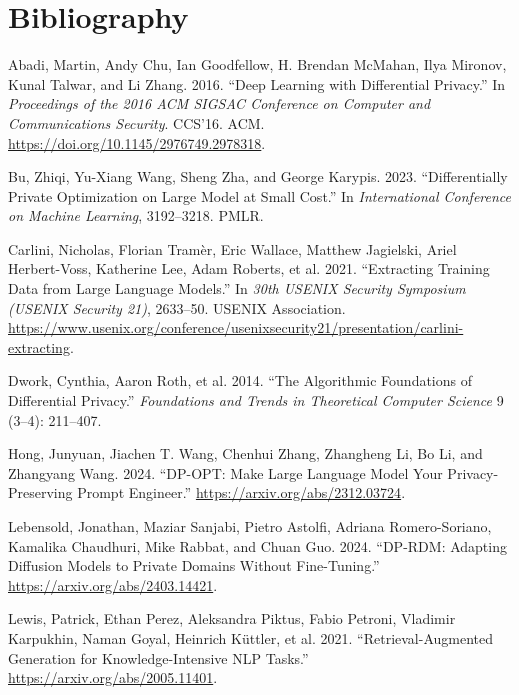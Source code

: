 \documentclass[conference]{IEEEtran}
\begin{document}
\section{Bibliography}\label{refs}
\begin{thebibliography}{00}
Abadi, Martin, Andy Chu, Ian Goodfellow, H. Brendan McMahan, Ilya
Mironov, Kunal Talwar, and Li Zhang. 2016. {``Deep Learning with
Differential Privacy.''} In \emph{Proceedings of the 2016 ACM SIGSAC
Conference on Computer and Communications Security}. CCS'16. ACM.
\url{https://doi.org/10.1145/2976749.2978318}.

Bu, Zhiqi, Yu-Xiang Wang, Sheng Zha, and George Karypis. 2023.
{``Differentially Private Optimization on Large Model at Small Cost.''}
In \emph{International Conference on Machine Learning}, 3192--3218.
PMLR.

Carlini, Nicholas, Florian Tramèr, Eric Wallace, Matthew Jagielski,
Ariel Herbert-Voss, Katherine Lee, Adam Roberts, et al. 2021.
{``Extracting Training Data from Large Language Models.''} In \emph{30th
USENIX Security Symposium (USENIX Security 21)}, 2633--50. USENIX
Association.
\url{https://www.usenix.org/conference/usenixsecurity21/presentation/carlini-extracting}.

Dwork, Cynthia, Aaron Roth, et al. 2014. {``The Algorithmic Foundations
of Differential Privacy.''} \emph{Foundations and
Trends{\textregistered} in Theoretical Computer Science} 9 (3--4):
211--407.

Hong, Junyuan, Jiachen T. Wang, Chenhui Zhang, Zhangheng Li, Bo Li, and
Zhangyang Wang. 2024. {``DP-OPT: Make Large Language Model Your
Privacy-Preserving Prompt Engineer.''}
\url{https://arxiv.org/abs/2312.03724}.

Lebensold, Jonathan, Maziar Sanjabi, Pietro Astolfi, Adriana
Romero-Soriano, Kamalika Chaudhuri, Mike Rabbat, and Chuan Guo. 2024.
{``DP-RDM: Adapting Diffusion Models to Private Domains Without
Fine-Tuning.''} \url{https://arxiv.org/abs/2403.14421}.

Lewis, Patrick, Ethan Perez, Aleksandra Piktus, Fabio Petroni, Vladimir
Karpukhin, Naman Goyal, Heinrich Küttler, et al. 2021.
{``Retrieval-Augmented Generation for Knowledge-Intensive NLP Tasks.''}
\url{https://arxiv.org/abs/2005.11401}.


\end{thebibliography}
\end{document}
